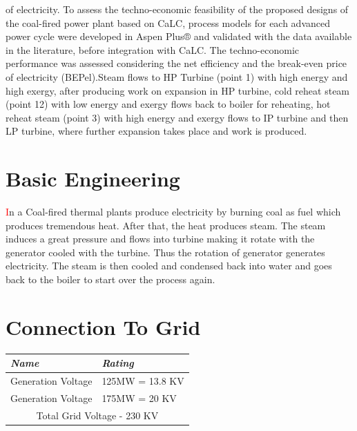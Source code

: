 \documentclass[11 pt]{article}
\begin{document}
{of electricity. To assess the techno-economic feasibility of the proposed designs of the coal-fired power plant based on CaLC, process models for each advanced power cycle were developed in Aspen Plus® and validated with the data available in the literature, before integration with CaLC. The techno-economic performance was assessed considering the net efficiency and the break-even price of electricity (BEPel).Steam flows to HP Turbine (point 1) with high energy and high exergy, after producing work on expansion in HP turbine, cold reheat steam (point 12) with low energy and exergy flows back to boiler for reheating, hot reheat steam (point 3) with high energy and exergy flows to IP turbine and then LP turbine, where further expansion takes place and work is produced.}

\section{Basic Engineering}
\justify
{
{\huge\textcolor{red}{\hspace{5 mm}I}}n a Coal-fired thermal plants produce electricity by burning coal as fuel which produces tremendous heat. After that, the heat produces steam. The steam induces a great pressure and flows into turbine  making it rotate with the generator cooled with the turbine. Thus the rotation of generator generates electricity. The steam is then cooled and condensed back into water and goes back to the boiler to start over the process again.
}

\pagebreak

\section{Connection To Grid}
	\begin{longtable}{|| m{10 em} | m{10 em} ||}
		\hline\hline
		\rowcolor{teal!20}
			\hline
			\rowcolor{green!70}
			\textbf{\textit{Name}} & \textbf{\textit{Rating}}\\
			\hline\hline
			Generation Voltage & 125MW = 13.8 KV\\
			\hline
			Generation Voltage & 175MW = 20 KV\\
			\hline
			\multicolumn{2}{c}{Total Grid Voltage - 230 KV}\\
			\hline\hline
	\end{longtable}
\end{document}

